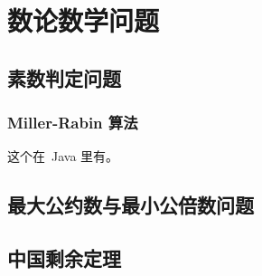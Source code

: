 \chapter{数论数学问题}

\section{素数判定问题}

\subsection{Miller-Rabin 算法}

这个在~Java 里有。

\section{最大公约数与最小公倍数问题}



\section{中国剩余定理}


